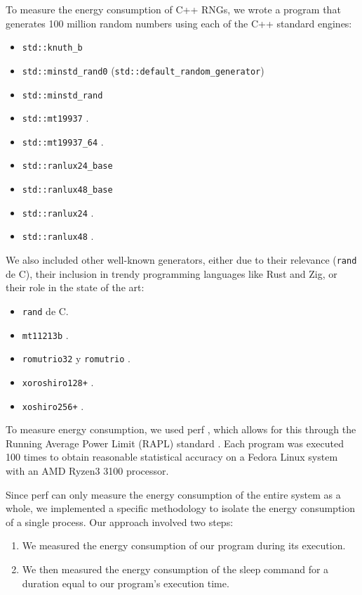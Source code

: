 \documentclass[sigconf]{acmart}
\begin{document}
To measure the energy consumption of C++ RNGs, we wrote a program that generates 100 million random numbers using each of the C++ standard engines:
\begin{itemize}
    \item \texttt{std::knuth\_b}
    \item \texttt{std::minstd\_rand0} (\texttt{std::default\_random\_generator})
    \item \texttt{std::minstd\_rand}
    \item \texttt{std::mt19937} \cite{mersennetwister}.
    \item \texttt{std::mt19937\_64} \cite{mersennetwister}.
    \item \texttt{std::ranlux24\_base}
    \item \texttt{std::ranlux48\_base}
    \item \texttt{std::ranlux24} \cite{JAMES1994111}.
    \item \texttt{std::ranlux48} \cite{JAMES1994111}.
\end{itemize}

We also included other well-known generators, either due to their relevance (\texttt{rand} de C), their inclusion in trendy programming languages like Rust and Zig, or their role in the state of the art:

\begin{itemize}
    \item \texttt{rand} de C.
    \item \texttt{mt11213b} \cite{mersennetwister}.
    \item \texttt{romutrio32} y \texttt{romutrio} \cite{overton2020romufastnonlinearpseudorandom}.
    \item \texttt{xoroshiro128+} \cite{blackman2021scrambled}.
    \item \texttt{xoshiro256+} \cite{blackman2021scrambled}.
\end{itemize}

To measure energy consumption, we used perf \cite{perf}, which allows for this through the Running Average Power Limit (RAPL) standard \cite{rapl}. Each program was executed 100 times to obtain reasonable statistical accuracy on a Fedora Linux system with an AMD Ryzen3 3100 processor.

Since perf can only measure the energy consumption of the entire system as a whole, we implemented a specific methodology to isolate the energy consumption of a single process. Our approach involved two steps:

\begin{enumerate}
\item We measured the energy consumption of our program during its execution.
\item We then measured the energy consumption of the sleep command for a duration equal to our program's execution time.
\end{enumerate}
\end{document}
